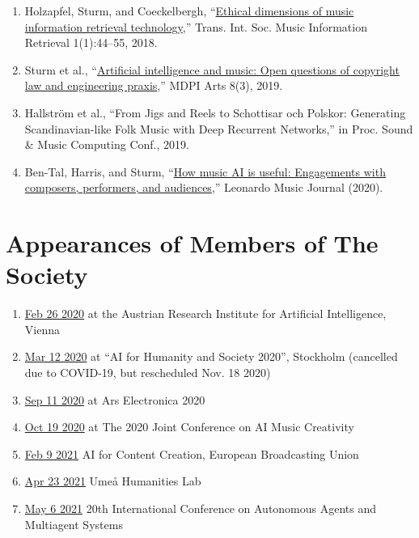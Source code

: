 \documentclass[a4paper,notitlepage,twoside]{book}
\begin{document}
\begin{enumerate}
\item Holzapfel, Sturm, and Coeckelbergh, “\href{https://transactions.ismir.net/articles/10.5334/tismir.13/}{Ethical dimensions of music information retrieval technology},” Trans. Int. Soc. Music Information Retrieval 1(1):44--55, 2018.
\item Sturm et al., “\href{https://www.mdpi.com/2076-0752/8/3/115}{Artificial intelligence and music: Open questions of copyright law and engineering praxis},” MDPI Arts 8(3), 2019.
\item Hallstr\"om et al., ``From Jigs and Reels to Schottisar och Polskor: Generating Scandinavian-like Folk Music with Deep Recurrent Networks,'' in Proc. Sound \& Music Computing Conf., 2019.
\item Ben-Tal, Harris, and Sturm, ``\href{https://www.mitpressjournals.org/doi/abs/10.1162/leon_a_01959}{How music AI is useful: Engagements with composers, performers, and audiences},'' Leonardo Music Journal (2020).
\end{enumerate}

\section{Appearances of Members of The Society}
\begin{enumerate}
\item \href{https://www.facebook.com/events/121474282609573/}{Feb 26 2020} at the Austrian Research Institute for Artificial Intelligence, Vienna
\item \href{https://wasp-hs.org/events/kick-off-wasp-hs/}{Mar 12 2020} at ``AI for Humanity and Society 2020'', Stockholm (cancelled due to COVID-19, but rescheduled Nov. 18 2020)
\item \href{https://ars.electronica.art/keplersgardens/en/kth/}{Sep 11 2020} at Ars Electronica 2020
\item \href{https://boblsturm.github.io/aimusic2020/}{Oct 19 2020} at The 2020 Joint Conference on AI Music Creativity 
\item \href{https://www.ebu.ch/events/2021/02/ai-for-content-creation}{Feb 9 2021} AI for Content Creation, European Broadcasting Union
\item \href{https://www.umu.se/en/events/music-ai-and-digital-tools_10320887}{Apr 23 2021} Umeå Humanities Lab
\item \href{https://aamas2021.soton.ac.uk/programme/social-activities}{May 6 2021} 20th International Conference on Autonomous Agents and Multiagent Systems
\end{enumerate}
\end{document}
